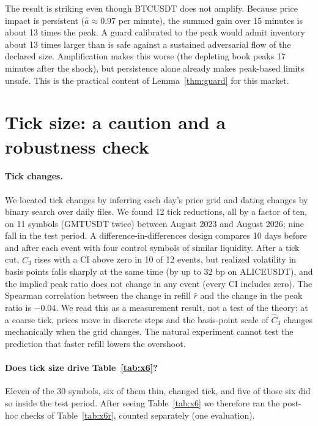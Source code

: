 \documentclass[12pt]{article}
\theoremstyle{definition}
\theoremstyle{remark}
\begin{document}
The result is striking even though BTCUSDT does not amplify. Because price impact is persistent ($\hat a\approx0.97$ per minute), the summed gain over 15 minutes is about 13 times the peak. A guard calibrated to the peak would admit inventory about 13 times larger than is safe against a sustained adversarial flow of the declared size. Amplification makes this worse (the depleting book peaks 17 minutes after the shock), but persistence alone already makes peak-based limits unsafe. This is the practical content of Lemma~\ref{thm:guard} for this market.

\section{Tick size: a caution and a robustness check}

\paragraph{Tick changes.} We located tick changes by inferring each day's price grid and dating changes by binary search over daily files. We found 12 tick reductions, all by a factor of ten, on 11 symbols (GMTUSDT twice) between August 2023 and August 2026; nine fall in the test period. A difference-in-differences design compares 10 days before and after each event with four control symbols of similar liquidity. After a tick cut, $\hat C_3$ rises with a CI above zero in 10 of 12 events, but realized volatility in basis points falls sharply at the same time (by up to 32 bp on ALICEUSDT), and the implied peak ratio does not change in any event (every CI includes zero). The Spearman correlation between the change in refill $\hat r$ and the change in the peak ratio is $-0.04$. We read this as a measurement result, not a test of the theory: at a coarse tick, prices move in discrete steps and the basis-point scale of $\hat C_3$ changes mechanically when the grid changes. The natural experiment cannot test the prediction that faster refill lowers the overshoot.

\paragraph{Does tick size drive Table~\ref{tab:x6}?} Eleven of the 30 symbols, six of them thin, changed tick, and five of those six did so inside the test period. After seeing Table~\ref{tab:x6} we therefore ran the post-hoc checks of Table~\ref{tab:x6r}, counted separately (one evaluation).
\end{document}
